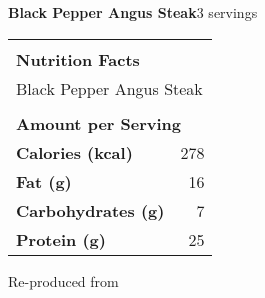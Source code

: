 \documentclass[../recipe-collections/cooking.tex]{subfiles}
\begin{document}
\begin{recipe}{\textbf{Black Pepper Angus Steak}}{3 servings}{}
  \bigskip
  \centering
  \begin{tabular}{|lr|}
    \hline
                                        &                                       \\
    \multicolumn{2}{|l|}{\huge{\textbf{\textrm{Nutrition Facts}}}}              \\
    \multicolumn{2}{|l|}{\textrm{Black Pepper Angus Steak}}                               \\ 
                                        &                                       \\
    \multicolumn{2}{|l|}{\footnotesize{\textbf{\textrm{Amount per Serving}}}}   \\ \hline
    \textbf{\textrm{Calories (kcal)}}   & \textrm{278}                          \\ \hline
    \textbf{\textrm{Fat (g)}}           & \textrm{16}                           \\ \hline
    \textbf{\textrm{Carbohydrates (g)}} & \textrm{7}                            \\ \hline
    \textbf{\textrm{Protein (g)}}       & \textrm{25}                            \\ \hline
  \end{tabular}

  \freeform{}\hrulefill{}

\end{recipe}

Re-produced from  
\autocite{ImHungryForThat_BlackPepperAngusSteak_2022}
\end{document}
